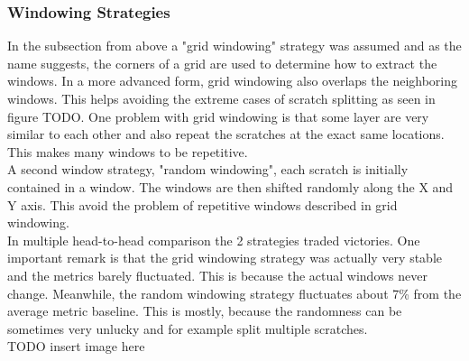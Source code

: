 \subsubsection{Windowing Strategies}
In the subsection from above a "grid windowing" strategy was assumed and as the name suggests, the corners of a grid are used to determine how to extract the windows. In a more advanced form, grid windowing also overlaps the neighboring windows. This helps avoiding the extreme cases of scratch splitting as seen in figure TODO. One problem with grid windowing is that some layer are very similar to each other and also repeat the scratches at the exact same locations. This makes many windows to be repetitive.\\
A second window strategy, "random windowing", each scratch is initially contained in a window. The windows are then shifted randomly along the X and Y axis. This avoid the problem of repetitive windows described in grid windowing. \\
In multiple head-to-head comparison the 2 strategies traded victories. One important remark is that the grid windowing strategy was actually very stable and the metrics barely fluctuated. This is because the actual windows never change. Meanwhile, the random windowing strategy fluctuates about 7\% from the average metric baseline. This is mostly, because the randomness can be sometimes very unlucky and for example split multiple scratches. \\

TODO insert image here \\

